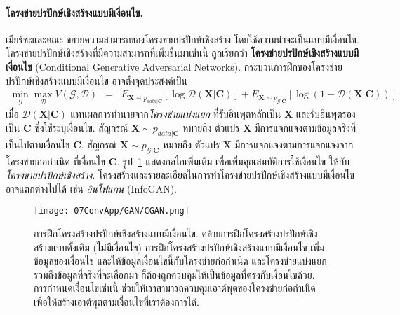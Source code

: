 \paragraph{โครงข่ายปรปักษ์เชิงสร้างแบบมีเงื่อนไข.}
เมียร์ซะและคณะ\cite{MirzaEtAl2014} ขยายความสามารถของโครงข่ายปรปักษ์เชิงสร้าง
โดยใช้ความน่าจะเป็นแบบมีเงื่อนไข.
โครงข่ายปรปักษ์เชิงสร้างที่มีความสามารถที่เพิ่มขึ้นมาเช่นนี้ ถูกเรียกว่า \textbf{โครงข่ายปรปักษ์เชิงสร้างแบบมีเงื่อนไข} (Conditional Generative Adversarial Networks).
% 
กระบวนการฝึกของโครงข่ายปรปักษ์เชิงสร้างแบบมีเงื่อนไข อาจตั้งจุดประสงค์เป็น
\begin{eqnarray}
\min_{\mathcal{G}} \max_{\mathcal{D}} V(\mathcal{G}, \mathcal{D})
&=& E_{\bm{X} \sim p_{data|\bm{C}}}[\log \mathcal{D}(\bm{X}|\bm{C})] 
+ E_{\bm{X} \sim p_{\mathcal{G}|\bm{C}}}[\log(1 - \mathcal{D}(\bm{X}|\bm{C}))]
\label{eq: convapp conditional GAN opt prob}
\end{eqnarray}
เมื่อ $\mathcal{D}(\bm{X}|\bm{C})$ แทนผลการทำนายจาก\textit{โครงข่ายแบ่งแยก} ที่รับอินพุตหลักเป็น $\bm{X}$ 
และรับอินพุตรองเป็น $\bm{C}$ ซึ่งใช้ระบุเงื่อนไข.
สัญกรณ์ $\bm{X} \sim p_{data|\bm{C}}$ หมายถึง ตัวแปร $\bm{X}$ มีการแจกแจงตามข้อมูลจริงที่เป็นไปตามเงื่อนไข $\bm{C}$.
สัญกรณ์ $\bm{X} \sim p_{\mathcal{G}|\bm{C}}$ หมายถึง ตัวแปร $\bm{X}$ มีการแจกแจงตามการแจกแจงจากโครงข่ายก่อกำเนิด ที่เงื่อนไข $\bm{C}$.
รูป~\ref{fig: conv app conditional GAN} แสดงกลไกเพิ่มเติม เพื่อเพิ่มคุณสมบัติการใช้เงื่อนไข ให้กับ\textit{โครงข่ายปรปักษ์เชิงสร้าง}.
โครงสร้างและรายละเอียดในการทำโครงข่ายปรปักษ์เชิงสร้างแบบมีเงื่อนไข อาจแตกต่างไปได้ เช่น \textit{อินโฟแกน} (InfoGAN\cite{InfoGAN}).

%
\begin{figure}
	\begin{center}
		\texttt{[image: 07ConvApp/GAN/CGAN.png]}
		\caption[การฝึกโครงสร้างปรปักษ์เชิงสร้างแบบมีเงื่อนไข]{การฝึกโครงสร้างปรปักษ์เชิงสร้างแบบมีเงื่อนไข. 
			คล้ายการฝึกโครงสร้างปรปักษ์เชิงสร้างแบบดั้งเดิม (ไม่มีเงื่อนไข)
			การฝึกโครงสร้างปรปักษ์เชิงสร้างแบบมีเงื่อนไข เพิ่มข้อมูลของเงื่อนไข และให้ข้อมูลเงื่อนไขนี้กับโครงข่ายก่อกำเนิด 
			และโครงข่ายแบ่งแยก
			รวมถึงข้อมูลที่จริงที่จะเลือกมา ก็ต้องถูกควบคุมให้เป็นข้อมูลที่ตรงกับเงื่อนไขด้วย.
			การกำหนดเงื่อนไขเช่นนี้ ช่วยให้เราสามารถควบคุมเอาต์พุตของโครงข่ายก่อกำเนิด เพื่อให้สร้างเอาต์พุตตามเงื่อนไขที่เราต้องการได้.
		}
		\label{fig: conv app conditional GAN}
	\end{center}
\end{figure}
%

